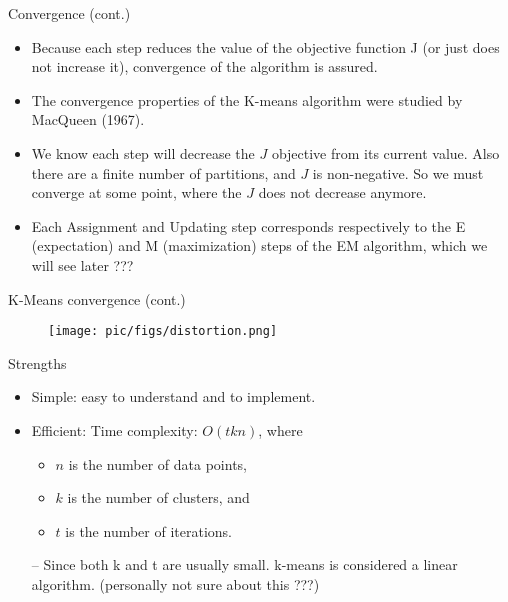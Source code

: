 \documentclass[serif, aspectratio=169]{beamer}
\begin{document}
\begin{frame}{Convergence (cont.)}
    \begin{itemize}
\item  Because each step reduces the value of the objective function J (or just does not increase it), convergence of the algorithm is assured.
\item  The convergence properties of the K-means algorithm were studied by MacQueen (1967).
\item We know each step will decrease the $J$ objective from its current value. Also there are a finite number of partitions, and $J$ is non-negative. So we must converge at some point, where the $J$ does not decrease anymore.
\item  Each Assignment and Updating step corresponds respectively to the E (expectation) and M (maximization) steps of the EM algorithm, which we will see later ???
    \end{itemize}

\end{frame}


\begin{frame}{K-Means convergence (cont.)}
    \begin{figure}
        \centering
        \texttt{[image: pic/figs/distortion.png]}
    \end{figure}
\end{frame}


\begin{frame}{Strengths}
    \begin{itemize}
        \item Simple: easy to understand and to implement.
        \item  Efficient: Time complexity: $O(tkn)$, 
where
\begin{itemize}
    
\item  $n$ is the number of data points, 
\item $k$ is the number of clusters, and 
\item $t$ is the number of iterations. 
\end{itemize}
– Since both k and t are usually small. k-means is considered a linear algorithm. (personally not sure about this ???)
        
    \end{itemize}
\end{frame}
\end{document}
